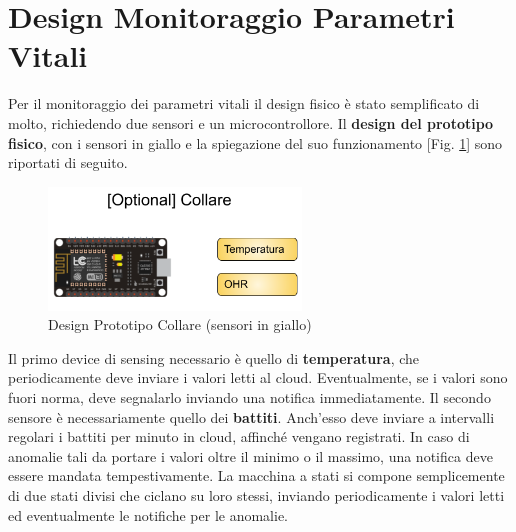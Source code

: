 \section{Design Monitoraggio Parametri Vitali}
Per il monitoraggio dei parametri vitali il design fisico è stato semplificato di molto, richiedendo due sensori e un microcontrollore. Il \textbf{design del prototipo fisico}, con i sensori in giallo e la spiegazione del suo funzionamento [Fig. \ref{fig:collare}] sono riportati di seguito.
    \begin{figure}[H]
        \caption{Design Prototipo Collare (sensori in giallo)}
        \label{fig:collare}
        \centering
        \includegraphics[width=0.6\textwidth]{Images/Collare.png}
    \end{figure}
Il primo device di sensing necessario è quello di \textbf{temperatura}, che periodicamente deve inviare i valori letti al cloud. Eventualmente, se i valori sono fuori norma, deve segnalarlo inviando una notifica immediatamente.
Il secondo sensore è necessariamente quello dei \textbf{battiti}. Anch'esso deve inviare a intervalli regolari i battiti per minuto in cloud, affinché vengano registrati. In caso di anomalie tali da portare i valori oltre il minimo o il massimo, una notifica deve essere mandata tempestivamente. 
La macchina a stati si compone semplicemente di due stati divisi che ciclano su loro stessi, inviando periodicamente i valori letti ed eventualmente le notifiche per le anomalie.
    
